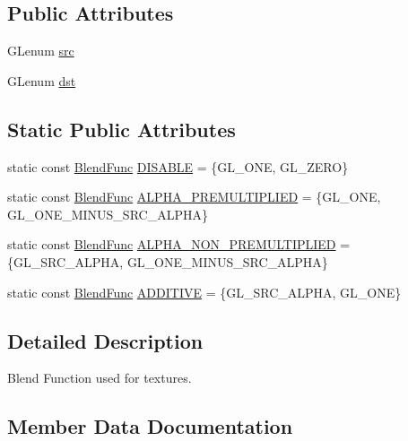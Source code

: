 \subsection*{Public Attributes}
\begin{DoxyCompactItemize}
\item 
G\+Lenum \hyperlink{structBlendFunc_a33bdda136b902748def90799d57dba69}{src}
\item 
G\+Lenum \hyperlink{structBlendFunc_ac56cb2239f7e360e27ce4d5f103317ad}{dst}
\end{DoxyCompactItemize}
\subsection*{Static Public Attributes}
\begin{DoxyCompactItemize}
\item 
static const \hyperlink{structBlendFunc}{Blend\+Func} \hyperlink{structBlendFunc_ad9011b05987e4f4583581272c0dbc4ed}{D\+I\+S\+A\+B\+LE} = \{G\+L\+\_\+\+O\+NE, G\+L\+\_\+\+Z\+E\+RO\}
\item 
static const \hyperlink{structBlendFunc}{Blend\+Func} \hyperlink{structBlendFunc_ad0c0511cec0e51605d241ab29cbf790d}{A\+L\+P\+H\+A\+\_\+\+P\+R\+E\+M\+U\+L\+T\+I\+P\+L\+I\+ED} = \{G\+L\+\_\+\+O\+NE, G\+L\+\_\+\+O\+N\+E\+\_\+\+M\+I\+N\+U\+S\+\_\+\+S\+R\+C\+\_\+\+A\+L\+P\+HA\}
\item 
static const \hyperlink{structBlendFunc}{Blend\+Func} \hyperlink{structBlendFunc_a40f94853e845907cf03c8e0d8ba95db6}{A\+L\+P\+H\+A\+\_\+\+N\+O\+N\+\_\+\+P\+R\+E\+M\+U\+L\+T\+I\+P\+L\+I\+ED} = \{G\+L\+\_\+\+S\+R\+C\+\_\+\+A\+L\+P\+HA, G\+L\+\_\+\+O\+N\+E\+\_\+\+M\+I\+N\+U\+S\+\_\+\+S\+R\+C\+\_\+\+A\+L\+P\+HA\}
\item 
static const \hyperlink{structBlendFunc}{Blend\+Func} \hyperlink{structBlendFunc_adc700a9627ad44dca29163719715a96e}{A\+D\+D\+I\+T\+I\+VE} = \{G\+L\+\_\+\+S\+R\+C\+\_\+\+A\+L\+P\+HA, G\+L\+\_\+\+O\+NE\}
\end{DoxyCompactItemize}


\subsection{Detailed Description}
Blend Function used for textures. 

\subsection{Member Data Documentation}
\mbox{\label{structBlendFunc_adc700a9627ad44dca29163719715a96e}} 
